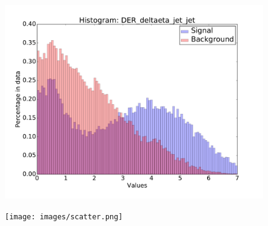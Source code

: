 \begin{figure}
\centering
\begin{minipage}[t]{.49\textwidth}
  \centering
  \includegraphics[width=\linewidth]{images/histogram.pdf}
  \label{fig:hist1}
\end{minipage}%
\hspace{0.5em}
\begin{minipage}[t]{.49\textwidth}
  \centering
  \texttt{[image: images/scatter.png]}
  \label{fig:scat1}
\end{minipage}
\end{figure}